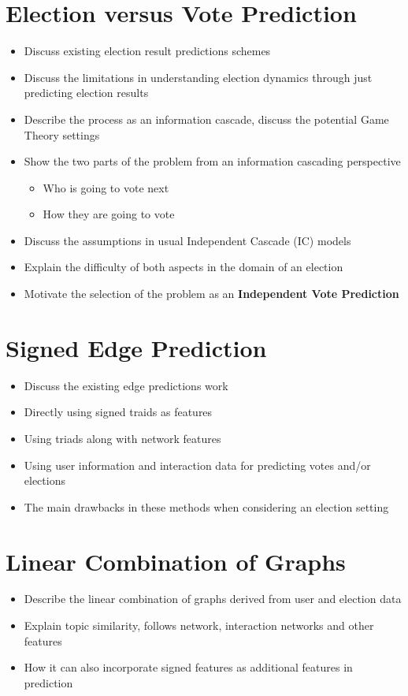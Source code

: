 \section{Election versus Vote Prediction}
\begin{itemize}
    \item Discuss existing election result predictions schemes
    \item Discuss the limitations in understanding election dynamics through just predicting election results
    \item Describe the process as an information cascade, discuss the potential Game Theory settings
    \item Show the two parts of the problem from an information cascading perspective 
     \begin{itemize}
        \item Who is going to vote next
        \item How they are going to vote
    \end{itemize}
    \item Discuss the assumptions in usual Independent Cascade (IC) models
    \item Explain the difficulty of both aspects in the domain of an election 
    \item Motivate the selection of the problem as an \textbf{Independent Vote Prediction}
\end{itemize}
\section{Signed Edge Prediction}
\begin{itemize}
    \item Discuss the existing edge predictions work
    \item Directly using signed traids as features
    \item Using triads along with network features
    \item Using user information and interaction data for predicting votes and/or elections
    \item The main drawbacks in these methods when considering an election setting
\end{itemize}
\section{Linear Combination of Graphs}
\begin{itemize}
    \item Describe the linear combination of graphs derived from user and election data
    \item Explain topic similarity, follows network, interaction networks and other features
    \item How it can also incorporate signed features as additional features in prediction
\end{itemize}
